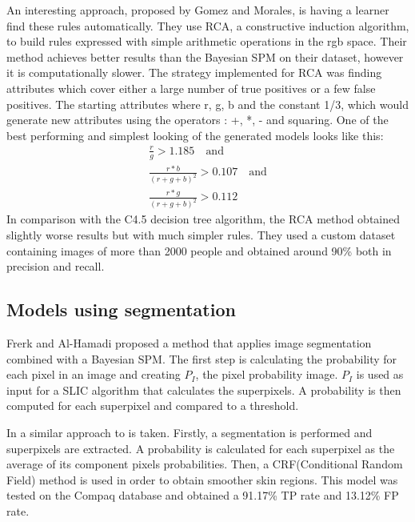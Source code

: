 \documentclass[12pt]{article}
\begin{document}
	An interesting approach, proposed by Gomez and Morales\cite{rca_threshold}, is having a learner find these rules automatically. They use RCA, a constructive induction algorithm, to build rules expressed with simple arithmetic operations in the rgb space. Their method achieves better results than the Bayesian SPM on their dataset, however it is computationally slower. The strategy implemented for RCA was finding attributes which cover either a large number of true positives or a few false positives. The starting attributes where r, g, b and the constant 1/3, which would generate new attributes using the operators : +, *, - and squaring. One of the best performing and simplest looking of the generated models looks like this:
	\begin{equation}
	\begin{split}
	\frac{r}{g} > 1.185 \quad \textrm{and}\\
	\frac{r * b}{(r + g + b)^2} > 0.107 \quad \textrm{and}\\
	\frac{r * g}{(r + g + b)^2} > 0.112
	\end{split}
	\end{equation}
	In comparison with the C4.5 decision tree algorithm, the RCA method obtained slightly worse results but with much simpler rules. They used a custom dataset containing images of more than 2000 people and obtained around 90\% both in precision and recall.
	
	\subsection{Models using segmentation}
	Frerk and Al-Hamadi\cite{superpixels_applied_1} proposed a method that applies image segmentation combined with a Bayesian SPM. The first step is calculating the probability for each pixel in an image and creating \(P_I\), the pixel probability image. \(P_I\) is used as input for a SLIC algorithm that calculates the superpixels. A probability is then computed for each superpixel and compared to a threshold.
	
	In \cite{superpixels_applied_2} a similar approach to \cite{superpixels_applied_1} is taken. Firstly, a segmentation is performed and superpixels are extracted. A probability is calculated for each superpixel as the average of its component pixels probabilities. Then, a CRF(Conditional Random Field) method is used in order to obtain smoother skin regions. This model was tested on the Compaq database and obtained a 91.17\% TP rate and 13.12\% FP rate.
	
\end{document}
